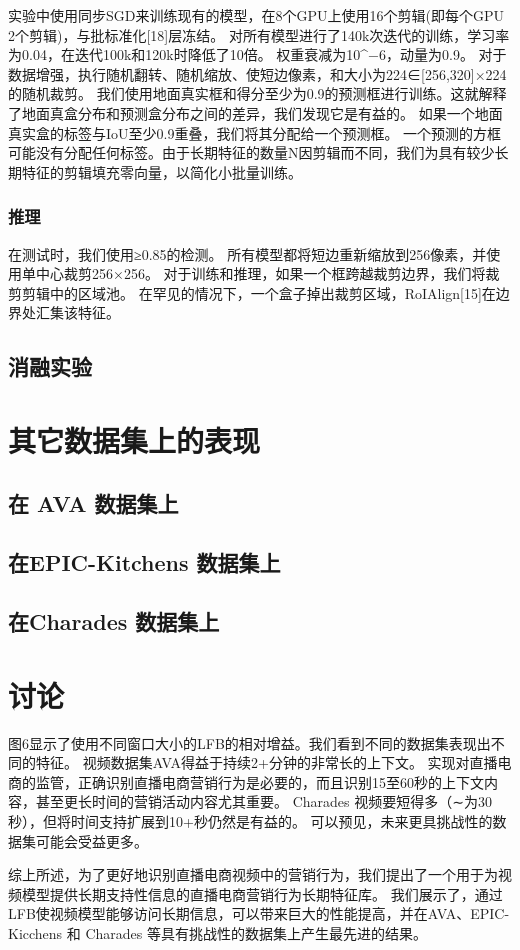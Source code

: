 实验中使用同步SGD来训练现有的模型，在8个GPU上使用16个剪辑(即每个GPU 2个剪辑)，与批标准化[18]层冻结。
对所有模型进行了140k次迭代的训练，学习率为0.04，在迭代100k和120k时降低了10倍。
权重衰减为10^−6，动量为0.9。
对于数据增强，执行随机翻转、随机缩放、使短边像素，和大小为224∈[256,320]×224的随机裁剪。
我们使用地面真实框和得分至少为0.9的预测框进行训练。这就解释了地面真盒分布和预测盒分布之间的差异，我们发现它是有益的。
如果一个地面真实盒的标签与IoU至少0.9重叠，我们将其分配给一个预测框。
一个预测的方框可能没有分配任何标签。由于长期特征的数量N因剪辑而不同，我们为具有较少长期特征的剪辑填充零向量，以简化小批量训练。

\subsubsection{推理}

在测试时，我们使用≥0.85的检测。
所有模型都将短边重新缩放到256像素，并使用单中心裁剪256×256。
对于训练和推理，如果一个框跨越裁剪边界，我们将裁剪剪辑中的区域池。
在罕见的情况下，一个盒子掉出裁剪区域，RoIAlign[15]在边界处汇集该特征。

\subsection{消融实验}

\section{其它数据集上的表现}
\subsection{在 AVA 数据集上}
\subsection{在EPIC-Kitchens 数据集上}
\subsection{在Charades 数据集上}

\section{讨论}

图6显示了使用不同窗口大小的LFB的相对增益。我们看到不同的数据集表现出不同的特征。
视频数据集AVA得益于持续2+分钟的非常长的上下文。
实现对直播电商的监管，正确识别直播电商营销行为是必要的，而且识别15至60秒的上下文内容，甚至更长时间的营销活动内容尤其重要。
Charades 视频要短得多（∼为30秒），但将时间支持扩展到10+秒仍然是有益的。
可以预见，未来更具挑战性的数据集可能会受益更多。

综上所述，为了更好地识别直播电商视频中的营销行为，我们提出了一个用于为视频模型提供长期支持性信息的直播电商营销行为长期特征库。
我们展示了，通过LFB使视频模型能够访问长期信息，可以带来巨大的性能提高，并在AVA、EPIC-Kicchens 和 Charades 等具有挑战性的数据集上产生最先进的结果。
